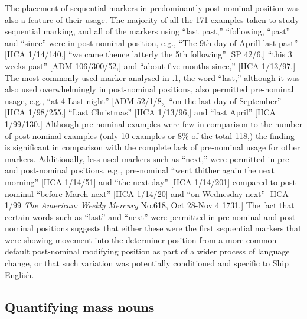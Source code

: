   The placement of sequential markers in predominantly post-nominal position was also a feature of their usage. The majority of all the 171 examples taken to study sequential marking, and all of the markers using “last past,” “following, “past” and “since” were in post-nominal position, e.g., “The 9th day of Aprill last past” [HCA 1/14/140,] “we came thence latterly the 5th following” [SP 42/6,] “this 3 weeks past” [ADM 106/300/52,] and “about five months since,” [HCA 1/13/97.] The most commonly used marker analysed in .1, the word “last,” although it was also used overwhelmingly in post-nominal positions, also permitted pre-nominal usage, e.g., “at 4 Last night” [ADM 52/1/8,] “on the last day of September” [HCA 1/98/255,] “Last Christmas” [HCA 1/13/96,] and “last April” [HCA 1/99/130.] Although pre-nominal examples were few in comparison to the number of post-nominal examples (only 10 examples or 8\% of the total 118,) the finding is significant in comparison with the complete lack of pre-nominal usage for other markers. Additionally, less-used markers such as “next,” were permitted in pre- and post-nominal positions, e.g., pre-nominal “went thither again the next morning” [HCA 1/14/51] and “the next day” [HCA 1/14/201] compared to post-nominal “before March next” [HCA 1/14/20] and “on Wednesday next” [HCA 1/99 \textit{The} \textit{American:} \textit{Weekly} \textit{Mercury} No.618, Oct 28-Nov 4 1731.] The fact that certain words such as “last” and “next” were permitted in pre-nominal and post-nominal positions suggests that either these were the first sequential markers that were showing movement into the determiner position from a more common default post-nominal modifying position as part of a wider process of language change, or that such variation was potentially conditioned and specific to Ship English. 

\subsection{\textbf{Quantifying} \textbf{mass} \textbf{nouns}}%


